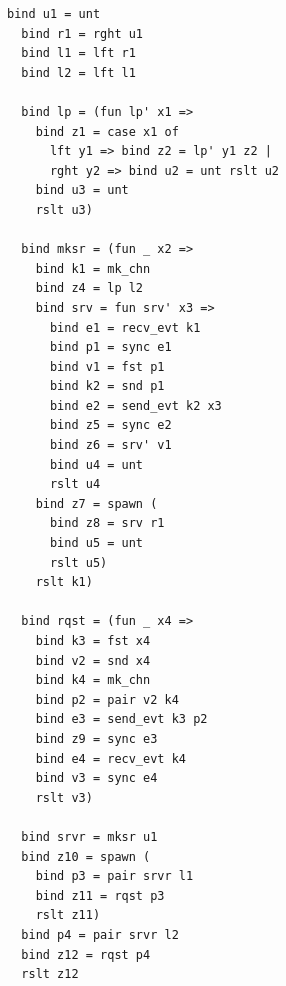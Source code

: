 \documentclass[10pt]{article}
\begin{document}
\begin{lstlisting}[language=normal_lang, mathescape]
  bind u1 = unt
  bind r1 = rght u1
  bind l1 = lft r1
  bind l2 = lft l1

  bind lp = (fun lp' x1 => 
    bind z1 = case x1 of 
      lft y1 => bind z2 = lp' y1 z2 |
      rght y2 => bind u2 = unt rslt u2
    bind u3 = unt
    rslt u3)

  bind mksr = (fun _ x2 => 
    bind k1 = mk_chn
    bind z4 = lp l2
    bind srv = fun srv' x3 =>
      bind e1 = recv_evt k1
      bind p1 = sync e1
      bind v1 = fst p1
      bind k2 = snd p1 
      bind e2 = send_evt k2 x3
      bind z5 = sync e2
      bind z6 = srv' v1
      bind u4 = unt
      rslt u4
    bind z7 = spawn (
      bind z8 = srv r1
      bind u5 = unt
      rslt u5)
    rslt k1)

  bind rqst = (fun _ x4 =>
    bind k3 = fst x4
    bind v2 = snd x4
    bind k4 = mk_chn
    bind p2 = pair v2 k4
    bind e3 = send_evt k3 p2
    bind z9 = sync e3
    bind e4 = recv_evt k4
    bind v3 = sync e4
    rslt v3)

  bind srvr = mksr u1
  bind z10 = spawn ( 
    bind p3 = pair srvr l1
    bind z11 = rqst p3
    rslt z11)
  bind p4 = pair srvr l2
  bind z12 = rqst p4
  rslt z12
  \end{lstlisting}
\end{document}
